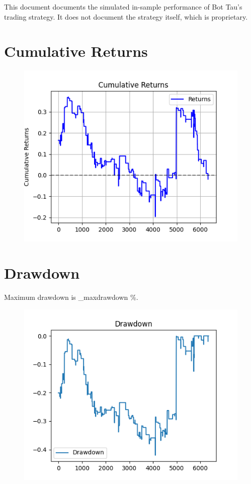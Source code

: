 \documentclass[a4paper]{article}
\title{\documenttitle}
\date{\today}
\author{Frans Englich \\
        \href{mailto:fenglich@fastmail.fm}{fenglich@fastmail.fm}}
\begin{document}
\maketitle

This document documents the simulated in-sample performance of Bot Tau's trading
strategy. It does not document the strategy itself, which is proprietary.

\section{Cumulative Returns}

\begin{figure}[H]
    \begin{center}
        \includegraphics{../generated/cumulative_returns.png}
    \end{center}
\end{figure}


\section{Drawdown}

Maximum drawdown is \constant_maxdrawdown \%.

\begin{figure}[H]
    \begin{center}
        \includegraphics{../generated/drawdown.png}
    \end{center}
\end{figure}

\end{document}
